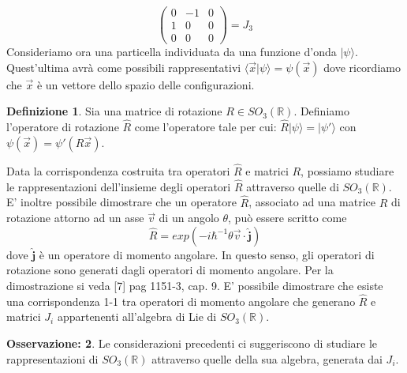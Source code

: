 \documentclass[12pt,a4paper]{report}
\theoremstyle{definition}
\newtheorem{Def}{Definizione}[chapter]
\theoremstyle{Theorem}
\theoremstyle{definition}
\theoremstyle{definition}
\theoremstyle{definition}
\newtheorem{Obs}[Def]{Osservazione:}
\begin{document}
$$
\begin{pmatrix}
	0 &-1&0\\
	1 &0&0\\
	0 &0&0
\end{pmatrix}= J_3$$
Consideriamo ora una particella individuata da una funzione d'onda $|\psi\rangle$. Quest'ultima avrà come possibili rappresentativi $\langle \vec{x}|\psi\rangle=\psi(\vec{x})$ dove ricordiamo che $\vec{x}$ è un vettore dello spazio delle configurazioni.
\begin{Def}
	Sia una matrice di rotazione $R\in SO_3(\mathbb{R})$. Definiamo l'operatore di rotazione $\hat{R}$ come l'operatore tale per cui:
	$\hat{R}|\psi\rangle=|\psi'\rangle$ con $\psi(\vec{x})=\psi'(R\vec{x})$.
\end{Def}
Data la corrispondenza costruita tra operatori $\hat{R}$ e matrici $R$, possiamo studiare le rappresentazioni dell'insieme degli operatori $\hat{R}$ attraverso quelle di $SO_3(\mathbb{R})$. E' inoltre possibile dimostrare che un operatore $\hat{R}$, associato ad una matrice $R$ di rotazione attorno ad un asse $\vec{v}$ di un angolo $\theta$, può essere scritto come 
$$\hat{R}=exp(-i\hbar^{-1}\theta\vec{v}\cdot\hat{\textbf{j}})$$
dove $\hat{\textbf{j}}$ è un operatore di momento angolare. In questo senso, gli operatori di rotazione sono generati dagli operatori di momento angolare. Per la dimostrazione si veda [7] pag 1151-3, cap. 9.
E' possibile dimostrare che esiste una corrispondenza 1-1 tra operatori di momento angolare che generano $\hat{R}$ e matrici $J_i$ appartenenti all'algebra di Lie di $SO_3(\mathbb{R})$.
\begin{comment}
E' noto, per il teorema delle rotazioni di Eulero, che ogni rotazione nello spazio tridimensionale lascia un asse fisso, passante per il centro di rotazione. Inoltre, vale la seguente relazione:
$$R_z(\theta)=\begin{pmatrix}
cos(\theta)&-sin(\theta)&0\\
sin(\theta)&cos(\theta)&0\\
0&0&1
\end{pmatrix}=e^{\theta J_3}$$
L'operatore associato a questa matrice è $\hat{R_z(\theta)}=exp(-i\hbar^{-1}\theta \hat{j_z})$ dove $\hat{j_z}$ è un operatore di momento angolare.
Possiamo allora generalizzare attraverso la formula di Rodrigues e scrivere, per una generica rotazione: 
\end{comment}
\begin{Obs}
	Le considerazioni precedenti ci suggeriscono di studiare le rappresentazioni di $SO_3(\mathbb{R})$ attraverso quelle della sua algebra, generata dai $J_i$.
\end{Obs}
\end{document}
